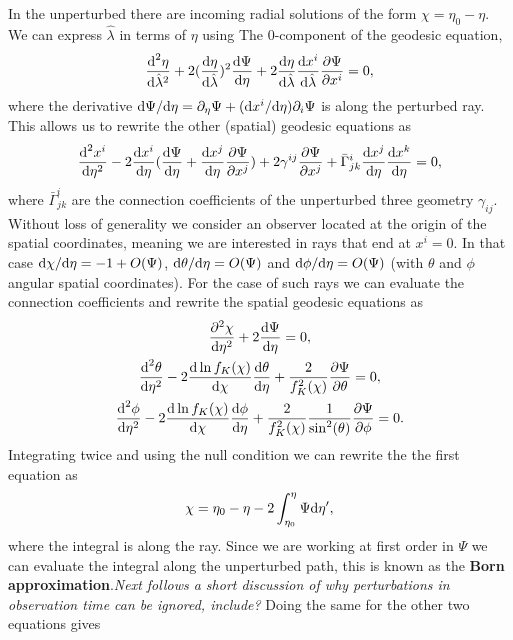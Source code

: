 \documentclass[11pt]{article} %
\DeclareRobustCommand{\d}{\ifmmode\text{d}\else d\fi}
\begin{document}
In the unperturbed there are incoming radial solutions of the form $\chi = \eta_0 - \eta$. We can express $\hat\lambda$ in terms of $\eta$ using The 0-component of the geodesic equation,
\begin{equation}
    \frac{\d^2\eta}{\d\hat\lambda^2} + 2(\frac{\d\eta}{\d\hat\lambda})^2\frac{\d\Psi}{\d\eta}+2\frac{\d\eta}{\d\hat\lambda}\frac{\d x^i}{\d\hat\lambda}\frac{\partial\Psi}{\partial x^i} = 0,
\end{equation}
where the derivative $\d\Psi/\d\eta = \partial_\eta\Psi+(\d x^i/\d\eta)\partial_i\Psi$ is along the perturbed ray. This allows us to rewrite the other (spatial) geodesic equations as
\begin{equation}
    \frac{\d^2x^i}{\d\eta^2} - 2\frac{\d x^i}{\d\eta}(\frac{\d\Psi}{\d\eta} + \frac{\d x^j}{\d\eta}\frac{\partial\Psi}{\partial x^j})+2\gamma^{ij}\frac{\partial\Psi}{\partial x^j}+\bar\Gamma^i_{jk}\frac{\d x^j}{\d\eta}\frac{\d x^k}{\d \eta} = 0,
\end{equation}
where $\bar\Gamma^i_{jk}$ are the connection coefficients of the unperturbed three geometry $\gamma_{ij}$. Without loss of generality we consider an observer located at the origin of the spatial coordinates, meaning we are interested in rays that end at $x^i = 0$. In that case $\d \chi/\d \eta = -1 + O(\Psi)$, $\d \theta/\d\eta = O(\Psi)$ and $\d \phi/\d\eta = O(\Psi)$ (with $\theta$ and $\phi$ angular spatial coordinates). For the case of such rays we can evaluate the connection coefficients and rewrite the spatial geodesic equations as
\begin{gather}
    \frac{\partial^2\chi}{\d\eta^2}+2\frac{\d\Psi}{\d\eta}=0,\\
    \frac{\d^2\theta}{\d\eta^2}-2\frac{\d\ln f_K(\chi)}{\d\chi}\frac{\d\theta}{\d\eta}+\frac{2}{f^2_K(\chi)}\frac{\partial\Psi}{\partial\theta}=0,\\
    \frac{\d^2\phi}{\d\eta^2} - 2\frac{\d \ln f_K(\chi)}{\d\chi}\frac{\d\phi}{\d\eta}+\frac{2}{f^2_K(\chi)}\frac{1}{\sin^2(\theta)}\frac{\partial\Psi}{\partial\phi}=0.
\end{gather}
Integrating twice and using the null condition we can rewrite the the first equation as
\begin{equation}
    \chi = \eta_0 - \eta - 2\int_{\eta_0}^\eta\Psi\d\eta',
\end{equation}
where the integral is along the ray. Since we are working at first order in $\Psi$ we can evaluate the integral along the unperturbed path, this is known as the \textbf{Born approximation}.\textit{Next follows a short discussion of why perturbations in observation time can be ignored, include?} Doing the same for the other two equations gives
\end{document}
